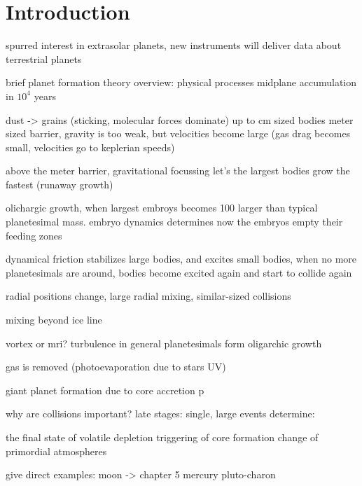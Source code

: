 \cleardoublepage
\chapter{Introduction}
\label{ch01}

spurred interest in extrasolar planets, new instruments will deliver data about terrestrial planets

brief planet formation theory overview: physical processes 
midplane accumulation in $10^4$ years

dust -> grains (sticking, molecular forces dominate) up to cm sized bodies
meter sized barrier, gravity is too weak, but velocities become large (gas drag becomes small, velocities go to keplerian speeds)
\cite{Benz1999Icar..142....5B}

above the meter barrier, gravitational focussing let's the largest bodies grow the fastest (runaway growth)


olichargic growth, when largest embroys becomes 100 larger than typical planetesimal mass. embryo dynamics determines now the \cite{1993Icar..106..210I} \cite{2010ApJ...714L.103O}
embryos empty their feeding zones


dynamical friction stabilizes large bodies, and excites small bodies, when no more planetesimals are around, bodies become excited again and start to collide again

radial positions change, large radial mixing, similar-sized collisions \cite{Chambers:2004p4098} \cite{Chambers:2001p2105}

mixing beyond ice line 



vortex or mri? \cite{Johansen:2007p37} turbulence in general \citep{2008ApJ...686.1292I} planetesimals form
oligarchic growth

gas is removed (photoevaporation due to stars UV)

giant planet formation due to core accretion \citep{1996Icar..124...62P}p

why are collisions important?
late stages: single, large events determine:

the final state of volatile depletion \citep{2001E&PSL.192..545H}
triggering of core formation \cite{1992Icar..100..326T}
change of primordial atmospheres \cite{2002DPS....34.2804A}

give direct examples:
moon -> chapter 5 \cite{Canup:2001p1861} \cite{1987Icar...71...30B} \cite{1975Icar...24..504H} \cite{1976LPI.....7..120C}
mercury \cite{Benz:1988p3336}
pluto-charon \cite{Canup:2005p1987}

